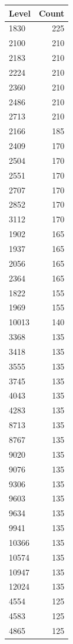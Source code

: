 \begin{table}[ht]
\centering
\begin{tabular}{lr}
  \hline
Level & Count \\ 
  \hline
1830 & 225 \\ 
  2100 & 210 \\ 
  2183 & 210 \\ 
  2224 & 210 \\ 
  2360 & 210 \\ 
  2486 & 210 \\ 
  2713 & 210 \\ 
  2166 & 185 \\ 
  2409 & 170 \\ 
  2504 & 170 \\ 
  2551 & 170 \\ 
  2707 & 170 \\ 
  2852 & 170 \\ 
  3112 & 170 \\ 
  1902 & 165 \\ 
  1937 & 165 \\ 
  2056 & 165 \\ 
  2364 & 165 \\ 
  1822 & 155 \\ 
  1969 & 155 \\ 
  10013 & 140 \\ 
  3368 & 135 \\ 
  3418 & 135 \\ 
  3555 & 135 \\ 
  3745 & 135 \\ 
  4043 & 135 \\ 
  4283 & 135 \\ 
  8713 & 135 \\ 
  8767 & 135 \\ 
  9020 & 135 \\ 
  9076 & 135 \\ 
  9306 & 135 \\ 
  9603 & 135 \\ 
  9634 & 135 \\ 
  9941 & 135 \\ 
  10366 & 135 \\ 
  10574 & 135 \\ 
  10947 & 135 \\ 
  12024 & 135 \\ 
  4554 & 125 \\ 
  4583 & 125 \\ 
  4865 & 125 \\ 

\end{tabular}
\end{table}
